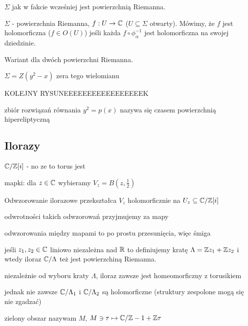 \begin{conclusion}{}{}
  $\Sigma$ jak w fakcie wcześniej jest powierzchnią Riemanna.
\end{conclusion}

\begin{definition}{}{}
  $\Sigma$ - powierzchnia Riemanna, $f:U\to \mathbb{C}$ ($U\subseteq\Sigma$ otwarty). Mówimy, że $f$ jest holomorficzna ($f\in O(U)$) jeśli każda $f\circ\phi_\alpha^{-1}$ jest holomorficzna na swojej dziedzinie.

  Wariant dla dwóch powierzchni Riemanna.
\end{definition}

\begin{example}[m]
\item $\Sigma=Z(y^2-x)$ zera tego wielomianu

  KOLEJNY RYSUNEEEEEEEEEEEEEEEEEK
  
  zbiór rozwiązań równania $y^2=p(x)$ nazywa się czasem powierzchnią hipereliptyczną
\end{example}

\subsection{Ilorazy}

$\mathbb{C}/\mathbb{Z}[i]$ - no ze to torus jest

mapki: dla $z\in\mathbb{C}$ wybieramy $V_z=B(z, \frac{1}{2})$

Odwzorowanie ilorazowe przekształca $V_z$ holomorficznie na $U_z\subseteq \mathbb{C}/\mathbb{Z}[i]$

odwrotności takich odwzorowań przyjmujemy za mapy

odwzorowania między mapami to po  prostu przesunięcia, więc śmiga

jeśli $z_1, z_2\in\mathbb{C}$ liniowo niezależna nad $\mathbb{R}$ to definiujemy kratę $\Lambda=\mathbb{Z} z_1+\mathbb{Z} z_2$ i wtedy iloraz $\mathbb{C}/\Lambda$ też jest powierzchiną Riemanna.

niezależnie od wyboru kraty $\Lambda$, iloraz zawsze jest homeomorficzny z torusikiem

jednak nie zawsze $\mathbb{C}/\Lambda_1$ i $\mathbb{C}/\Lambda_2$ są holomorficzne (struktury zespolone mogą się nie zgadzać)

\begin{center}
\end{center}
zielony obszar nazywam $M$, $M\ni \tau\mapsto \mathbb{C}/\mathbb{Z}-1+\mathbb{Z}\tau$

